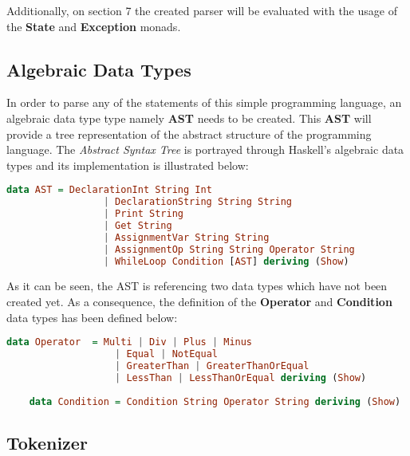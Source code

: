\documentclass[a4paper, onecolumn]{article}
\begin{document}
    \noindent Additionally, on section 7 the created parser will be evaluated with the usage of the \textbf{State} and \textbf{Exception} monads. 
    
    \subsection{Algebraic Data Types}
    
    In order to parse any of the statements of this simple programming language, an algebraic data type type namely \textbf{AST} needs to be created. This \textbf{AST} will provide a tree representation of the abstract structure of the programming language. The \textit{Abstract Syntax Tree} is portrayed through Haskell's algebraic data types and its implementation is illustrated below:
    
    \begin{tcolorbox}
    \begin{lstlisting}[language=Haskell] 
        data AST = DeclarationInt String Int 
                 | DeclarationString String String
                 | Print String
                 | Get String
                 | AssignmentVar String String
                 | AssignmentOp String String Operator String 
                 | WhileLoop Condition [AST] deriving (Show)
    \end{lstlisting}
    \end{tcolorbox}
    
    \noindent As it can be seen, the AST is referencing two data types which have not been created yet. As a consequence, the definition of the \textbf{Operator} and \textbf{Condition} data types has been defined below: 
    
    \begin{tcolorbox}
    \begin{lstlisting}[language=Haskell] 
    data Operator  = Multi | Div | Plus | Minus
                   | Equal | NotEqual
                   | GreaterThan | GreaterThanOrEqual 
                   | LessThan | LessThanOrEqual deriving (Show)
        
    data Condition = Condition String Operator String deriving (Show) 
    \end{lstlisting}
    \end{tcolorbox}
    
    \subsection{Tokenizer}
    
\end{document}
